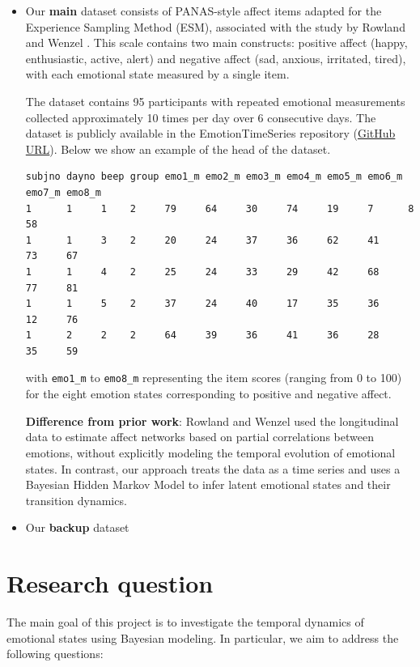 \documentclass[a4paper,11pt]{article}
\begin{document}
\begin{itemize}
   \item Our \textbf{main} dataset consists of PANAS-style affect items adapted for the Experience Sampling Method (ESM), associated with the study by Rowland and Wenzel \cite{Rowland2020}. This scale contains two main constructs: positive affect (happy, enthusiastic, active, alert) and negative affect (sad, anxious, irritated, tired), with each emotional state measured by a single item.

The dataset contains 95 participants with repeated emotional measurements collected approximately 10 times per day over 6 consecutive days. The dataset is publicly available in the EmotionTimeSeries repository (\href{https://github.com/jmbh/EmotionTimeSeries}{GitHub URL}). Below we show an example of the head of the dataset.

\begin{verbatim}
subjno dayno beep group emo1_m emo2_m emo3_m emo4_m emo5_m emo6_m emo7_m emo8_m
1      1     1    2     79     64     30     74     19     7      8      58
1      1     3    2     20     24     37     36     62     41     73     67
1      1     4    2     25     24     33     29     42     68     77     81
1      1     5    2     37     24     40     17     35     36     12     76
1      2     2    2     64     39     36     41     36     28     35     59
\end{verbatim}
with \texttt{emo1\_m} to \texttt{emo8\_m} representing the item scores (ranging from 0 to 100) for the eight emotion states corresponding to positive and negative affect.

\textbf{Difference from prior work}: Rowland and Wenzel \cite{Rowland2020} used the longitudinal data to estimate affect networks based on partial correlations between emotions, without explicitly modeling the temporal evolution of emotional states. In contrast, our approach treats the data as a time series and uses a Bayesian Hidden Markov Model to infer latent emotional states and their transition dynamics.

\item Our \textbf{backup} dataset 
\end{itemize}
\section{Research question}

The main goal of this project is to investigate the temporal dynamics of emotional states using Bayesian modeling. In particular, we aim to address the following questions:
\end{document}

